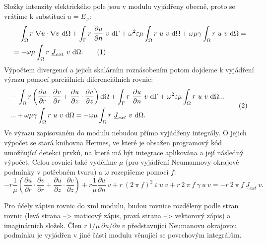\documentclass[12pt,a4paper,oneside]{article}
\numberwithin{equation}{section} %
\numberwithin{figure}{section} %
\numberwithin{table}{section} %
\newcommand{\faz}[1]{{\underline{#1}}} %
\newcommand\numberthis{\addtocounter{equation}{1}\tag{\theequation}}
\begin{document}
Složky intenzity elektrického pole jsou v modulu vyjádřeny obecně, proto se vrátíme k substituci $u = E_\varphi$:
\begin{align*}
&- \int _{\Omega} r ~ \nabla u \cdot \nabla v ~ \ud \Omega + \int _{\Gamma} r ~ \frac{\partial u}{\partial n} ~ v ~ \ud \Gamma + \omega ^2 \varepsilon \mu \int _{\Omega} r ~ u ~ v ~ \ud \Omega + \omega \mu \gamma \int _{\Omega} r ~ u ~ v ~ \ud \Omega =\\
&= - \omega \mu \int _{\Omega} r ~ \faz{J} _{ext} ~ v ~ \ud \Omega .
\numberthis
\end{align*}
Výpočtem divergencí a jejich skalárním roznásobením potom dojdeme k vyjádření výrazu pomocí parciálních diferenciálních rovnic:
\begin{equation*}
\begin{split}
&- \int _{\Omega} r \left( \frac{\partial u}{\partial r} \cdot \frac{\partial v}{\partial r} + \frac{\partial u}{\partial z} \cdot \frac{\partial v}{\partial z} \right) \ud \Omega + \int _{\Gamma} r ~ \frac{\partial u}{\partial n} ~ v ~ \ud \Gamma + \omega ^2 \varepsilon \mu \int _{\Omega} r ~ u ~ v ~ \ud \Omega...\\
&... + \omega \mu \gamma \int _{\Omega} r ~ u ~ v ~ \ud \Omega = - \omega \mu \int _{\Omega} r ~ \faz{J} _{ext} ~ v ~ \ud \Omega .
\end{split}
\numberthis
\end{equation*}
Ve výrazu zapisovaném do modulu nebudou přímo vyjádřeny integrály. O jejich výpočet se stará knihovna Hermes, ve které je obsažen programový kód umožňující detekci prvků, na které má být integrace aplikována a její následný výpočet. Celou rovnici také vydělíme $\mu$ (pro vyjádření Neumannovy okrajové podmínky v potřebném tvaru) a $\omega$ rozepíšeme pomocí $f$:
\begin{equation}
\label{EphiWeakEpsilon}
- r \frac{1}{\mu} \left( \frac{\partial u}{\partial r} \cdot \frac{\partial v}{\partial r} + \frac{\partial u}{\partial z} \cdot \frac{\partial v}{\partial z} \right) + r \frac{1}{\mu} \frac{\partial u}{\partial n} ~ v + r ~ (2 ~ \pi ~ f) ^2 ~ \varepsilon ~ u ~ v + r ~ 2 ~ \pi ~ f ~ \gamma ~ u ~ v = - r ~ 2 ~ \pi ~ f ~ \faz{J} _{ext} ~ v .
\end{equation}

Pro účely zápisu rovnic do xml modulu, budou rovnice rozděleny podle stran rovnic (levá strana --> maticový zápis, pravá strana --> vektorový zápis) a imaginárních složek. Člen $r ~ 1/ \mu ~ \partial u / \partial n ~ v$ představující Neumanovu okrajovou podmínku je vyjádřen v jiné části modulu věnující se povrchovým integrálům.
\end{document}
